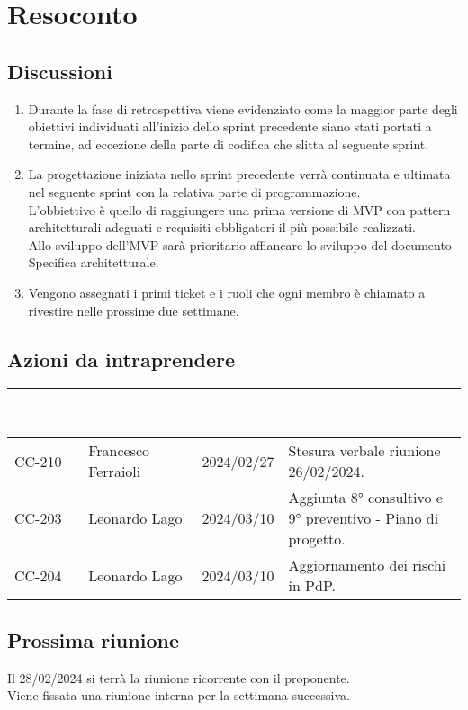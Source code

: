 \section{Resoconto} \label{sec:resoconto}
\subsection{Discussioni} \label{subsec:resdiscussione}
\begin{enumerate}
    \item Durante la fase di retrospettiva viene evidenziato come la maggior parte degli obiettivi individuati all'inizio dello sprint precedente siano stati portati a termine, ad eccezione della parte di codifica che slitta al seguente sprint. 
    
    \item La progettazione iniziata nello sprint precedente verrà continuata e ultimata nel seguente sprint con la relativa parte di programmazione. \\
    L'obbiettivo è quello di raggiungere una prima versione di MVP con pattern architetturali adeguati e requisiti obbligatori il più possibile realizzati. \\
    Allo sviluppo dell'MVP sarà prioritario affiancare lo sviluppo del documento Specifica architetturale.
    
    \item Vengono assegnati i primi ticket e i ruoli che ogni membro è chiamato a rivestire nelle prossime due settimane.
\end{enumerate}

\subsection{Azioni da intraprendere}
{
    \setlength{\tabcolsep}{10pt}
            \renewcommand{\arraystretch}{1.5}
            \begin{xltabular}{\textwidth}{| l | l | l | X |}
                 \hline
                 \textbf{\textcolor{white}{Codice issue}} & \textbf{\textcolor{white}{Assegnatario}} & \textbf{\textcolor{white}{Scadenza}} & \textbf{\textcolor{white}{Descrizione}} \\
                 \hline
                 CC-210 & Francesco Ferraioli & 2024/02/27 & Stesura verbale riunione 26/02/2024.\\
                 \hline
                 CC-203 & Leonardo Lago & 2024/03/10 & Aggiunta 8° consultivo e 9° preventivo - Piano di progetto.\\
                 \hline
                 CC-204 & Leonardo Lago & 2024/03/10 & Aggiornamento dei rischi in PdP.\\
                 \hline
                 
            \end{xltabular}
}

\subsection{Prossima riunione} \label{subsec:riunione}
Il 28/02/2024 si terrà la riunione ricorrente con il proponente. \\ 
Viene fissata una riunione interna per la settimana successiva.
